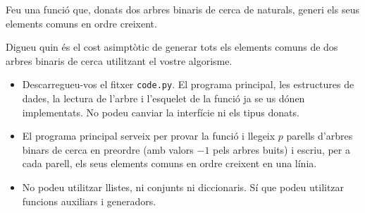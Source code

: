
\newcommand{\bolarep}[1]{\Tcircle{\mbox{\scriptsize #1}}}
\newcommand{\arbrerep}[2]{\pstree[levelsep=25pt,treesep=12pt]{\bolarep{#1}}{#2}}




\Statement

Feu una funció que, donats dos arbres binaris de cerca de naturals, generi els seus elements comuns en ordre creixent.

\medskip

Digueu quin és el cost asimptòtic de generar tots els elements comuns de dos arbres binaris de cerca utilitzant el vostre algorisme.

\Observations

\begin{itemize}
    
    \item Descarregueu-vos el fitxer \texttt{code.py}. El programa principal, les estructures de dades, la lectura de l'arbre i l'esquelet de la funció ja se us dónen implementats. No podeu canviar la interfície ni els tipus donats.

    \item
    El programa principal serveix per provar la funció i llegeix $p$ parells d'arbres
binars de cerca en preordre (amb valors $-1$ pels arbres buits)  i escriu, per a cada parell, els seus elements comuns en ordre creixent en una línia. 

    \item No podeu utilitzar llistes, ni conjunts ni diccionaris. Sí que podeu utilitzar funcions auxiliars i generadors.

    
\end{itemize}


\SampleOneCol

